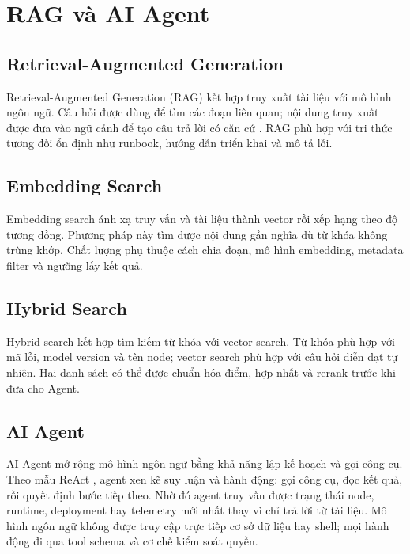 \section{RAG và AI Agent}

\subsection{Retrieval-Augmented Generation}

Retrieval-Augmented Generation (RAG) kết hợp truy xuất tài liệu với mô hình
ngôn ngữ. Câu hỏi được dùng để tìm các đoạn liên quan; nội dung truy xuất được
đưa vào ngữ cảnh để tạo câu trả lời có căn cứ \cite{lewis2020rag}. RAG phù hợp với tri
thức tương đối ổn định như runbook, hướng dẫn triển khai và mô tả lỗi.

\subsection{Embedding Search}

Embedding search ánh xạ truy vấn và tài liệu thành vector rồi xếp hạng theo độ
tương đồng. Phương pháp này tìm được nội dung gần nghĩa dù từ khóa không trùng
khớp. Chất lượng phụ thuộc cách chia đoạn, mô hình embedding, metadata filter và
ngưỡng lấy kết quả.

\subsection{Hybrid Search}

Hybrid search kết hợp tìm kiếm từ khóa với vector search. Từ khóa phù hợp với mã
lỗi, model version và tên node; vector search phù hợp với câu hỏi diễn đạt tự
nhiên. Hai danh sách có thể được chuẩn hóa điểm, hợp nhất và rerank trước khi đưa
cho Agent.

\subsection{AI Agent}

AI Agent mở rộng mô hình ngôn ngữ bằng khả năng lập kế hoạch và gọi công cụ.
Theo mẫu ReAct \cite{yao2023react}, agent xen kẽ suy luận và hành động: gọi công
cụ, đọc kết quả, rồi quyết định bước tiếp theo. Nhờ đó agent truy vấn được trạng
thái node, runtime, deployment hay telemetry mới nhất thay vì chỉ trả lời từ tài
liệu. Mô hình ngôn ngữ không được truy cập trực tiếp cơ sở dữ liệu hay shell; mọi
hành động đi qua tool schema và cơ chế kiểm soát quyền.

